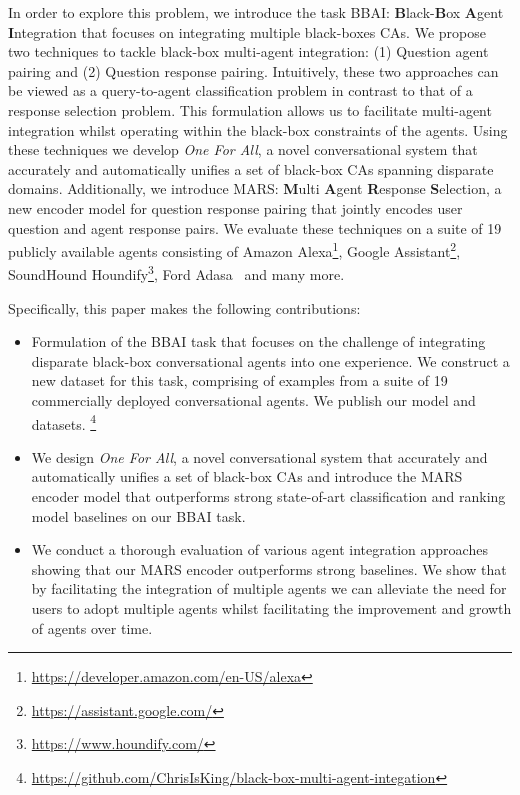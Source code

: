 \documentclass[11pt]{article}
\begin{document}
In order to explore this problem, we introduce the task BBAI: \textbf{B}lack-\textbf{B}ox \textbf{A}gent \textbf{I}ntegration that focuses on integrating multiple black-boxes CAs. We propose two techniques to tackle black-box multi-agent integration: (1) Question agent pairing and (2) Question response pairing. Intuitively, these two approaches can be viewed as a query-to-agent classification problem in contrast to that of a response selection problem. This formulation allows us to facilitate multi-agent integration whilst operating within the black-box constraints of the agents.
Using these techniques we develop \emph{One For All}, a novel conversational system that accurately and automatically unifies a set of black-box CAs spanning disparate domains. Additionally, we introduce MARS: \textbf{M}ulti \textbf{A}gent \textbf{R}esponse \textbf{S}election, a new encoder model for question response pairing that jointly encodes user question and agent response pairs.
We evaluate these techniques on a suite of 19 publicly available agents consisting of Amazon Alexa\footnote{\url{https://developer.amazon.com/en-US/alexa}}, Google Assistant\footnote{\url{https://assistant.google.com/}}, SoundHound Houndify\footnote{\url{https://www.houndify.com/}}, Ford Adasa~\cite{Lin2018Adasa} and many more.

Specifically, this paper makes the following contributions:

\begin{itemize}
    \item Formulation of the BBAI task that focuses on the challenge of integrating disparate black-box conversational agents into one experience. We construct a new dataset for this task, comprising of examples from a suite of 19 commercially deployed conversational agents. We publish our model and datasets. \footnote{\url{https://github.com/ChrisIsKing/black-box-multi-agent-integation}}
    
    \item We design \emph{One For All}, a novel conversational system that accurately and automatically unifies a set of black-box CAs and introduce the MARS encoder model that outperforms strong state-of-art classification and ranking model baselines on our BBAI task.
    
    \item We conduct a thorough evaluation of various agent integration approaches showing that our MARS encoder outperforms strong baselines. We show that by facilitating the integration of multiple agents we can alleviate the need for users to adopt multiple agents whilst facilitating the improvement and growth of agents over time.
\end{itemize}
\end{document}
